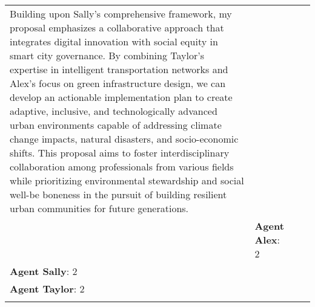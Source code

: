 \documentclass{article}
\begin{document}
\begin{appendix}
\begin{tabular}{| m{2cm} | m{3cm} | m{5cm} | m{5cm} |}
Building upon Sally's comprehensive framework, my proposal emphasizes a collaborative approach that integrates digital innovation with social equity in smart city governance. By combining Taylor's expertise in intelligent transportation networks and Alex's focus on green infrastructure design, we can develop an actionable implementation plan to create adaptive, inclusive, and technologically advanced urban environments capable of addressing climate change impacts, natural disasters, and socio-economic shifts. This proposal aims to foster interdisciplinary collaboration among professionals from various fields while prioritizing environmental stewardship and social well-be boneness in the pursuit of building resilient urban communities for future generations. \\ 
 & \textbf{Agent Alex}: 2 \\ 
\textbf{Agent Sally}: 2 \\ 
\textbf{Agent Taylor}: 2 \\ 
 \\
\hline

\end{tabular}
\end{appendix}
\end{document}
